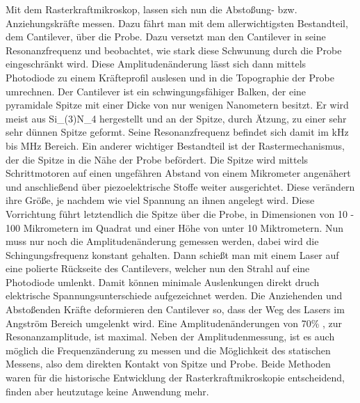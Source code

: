 Mit dem Rasterkraftmikroskop, lassen sich nun die Abstoßung- bzw. Anziehungskräfte messen. Dazu fährt man mit dem allerwichtigsten Bestandteil, dem Cantilever, über die Probe. 
Dazu versetzt man den Cantilever in seine Resonanzfrequenz und beobachtet, wie stark diese Schwunung durch die Probe eingeschränkt wird.
Diese Amplitudenänderung lässt sich dann mittels Photodiode zu einem Kräfteprofil auslesen und in die Topographie der Probe umrechnen.
Der Cantilever ist ein schwingungsfähiger Balken, der eine pyramidale Spitze mit einer Dicke von nur wenigen Nanometern besitzt.
Er wird meist aus Si_(3)N_4 hergestellt und an der Spitze, durch Ätzung, zu einer sehr sehr dünnen Spitze geformt.
Seine Resonanzfrequenz befindet sich damit im kHz bis MHz Bereich.
Ein anderer wichtiger Bestandteil ist der Rastermechanismus, der die Spitze in die Nähe der Probe befördert. Die Spitze wird mittels Schrittmotoren auf einen ungefähren Abstand von einem Mikrometer angenähert und anschließend über piezoelektrische Stoffe weiter ausgerichtet.
Diese verändern ihre Größe, je nachdem wie viel Spannung an ihnen angelegt wird. 
Diese Vorrichtung führt letztendlich die Spitze über die Probe, in Dimensionen von 10 - 100 Mikrometern im Quadrat und einer Höhe von unter 10 Miktrometern.
Nun muss nur noch die Amplitudenänderung gemessen werden, dabei wird die Schingungsfrequenz konstant gehalten. 
Dann schießt man mit einem Laser auf eine polierte Rückseite des Cantilevers, welcher nun den Strahl auf eine Photodiode umlenkt. 
Damit können minimale Auslenkungen direkt druch elektrische Spannungsunterschiede aufgezeichnet werden.
Die Anziehenden und Abstoßenden Kräfte deformieren den Cantilever so, dass der Weg des Lasers im Angström Bereich umgelenkt wird. 
Eine Amplitudenänderungen von 70\% , zur Resonanzamplitude, ist maximal. 
Neben der Amplitudenmessung, ist es auch möglich die Frequenzänderung zu messen und die Möglichkeit des statischen Messens, also dem direkten Kontakt von Spitze und Probe.
Beide Methoden waren für die historische Entwicklung der Rasterkraftmikroskopie entscheidend, finden aber heutzutage keine Anwendung mehr.



